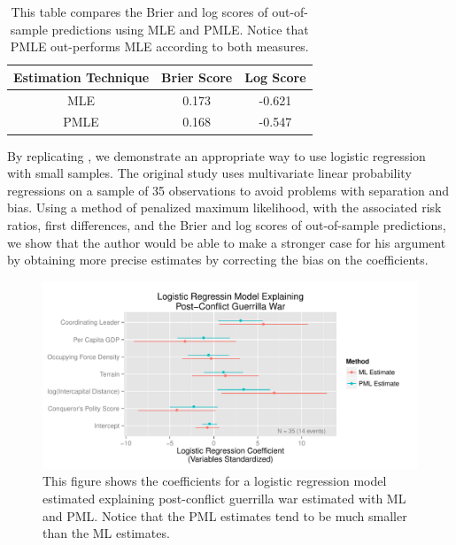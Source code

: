 \documentclass[12pt]{article}
\begin{document}
\singlespace
\begin{table}[H]
\begin{center}
\begin{tabular}{| c | c | c |}
\hline
Estimation Technique & Brier Score & Log Score \\
\hline
MLE & 0.173 & -0.621 \\
PMLE & 0.168 & -0.547 \\
\hline
\end{tabular}\caption{This table compares the Brier and log scores of out-of-sample predictions using MLE and PMLE. Notice that PMLE out-performs MLE according to both measures.}\label{tab:scores}
\end{center}
\end{table}
\doublespace

By replicating \citet{Weisiger2014}, we demonstrate an appropriate way to use logistic regression with small samples. The original study uses multivariate linear probability regressions on a sample of 35 observations to avoid problems with separation and bias. Using a method of penalized maximum likelihood, with the associated risk ratios, first differences, and the Brier and log scores of out-of-sample predictions, we show that the author would be able to make a stronger case for his argument by obtaining more precise estimates by correcting the bias on the coefficients.

\begin{figure}[H]
\begin{center}
\includegraphics[width = \textwidth]{figs/weisiger-coefs.pdf}
\caption{This figure shows the coefficients for a logistic regression model estimated explaining post-conflict guerrilla war estimated with ML and PML. Notice that the PML estimates tend to be much smaller than the ML estimates.}\label{fig:weisiger-coefs}
\end{center}
\end{figure}
\end{document}
